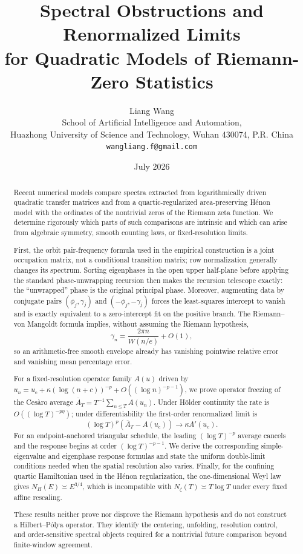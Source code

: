 \documentclass[11pt]{article}
\title{\textbf{Spectral Obstructions and Renormalized Limits}\\
\textbf{for Quadratic Models of Riemann-Zero Statistics}}
\author{Liang Wang\\
\small School of Artificial Intelligence and Automation,\\[-0.2em]
\small Huazhong University of Science and Technology, Wuhan 430074, P.R. China\\
\small \texttt{wangliang.f@gmail.com}}
\date{July 2026}
\theoremstyle{definition}
\theoremstyle{remark}
\newcommand{\uc}{u_{\mathrm c}}
\begin{document}
\maketitle

\begin{abstract}
Recent numerical models compare spectra extracted from logarithmically driven quadratic transfer matrices and from a quartic-regularized area-preserving H\'{e}non model with the ordinates of the nontrivial zeros of the Riemann zeta function.  We determine rigorously which parts of such comparisons are intrinsic and which can arise from algebraic symmetry, smooth counting laws, or fixed-resolution limits.

First, the orbit pair-frequency formula used in the empirical construction is a joint occupation matrix, not a conditional transition matrix; row normalization generally changes its spectrum.  Sorting eigenphases in the open upper half-plane before applying the standard phase-unwrapping recursion then makes the recursion telescope exactly: the ``unwrapped'' phase is the original principal phase.  Moreover, augmenting data by conjugate pairs $(\phi_j,\gamma_j)$ and $(-\phi_j,-\gamma_j)$ forces the least-squares intercept to vanish and is exactly equivalent to a zero-intercept fit on the positive branch.  The Riemann--von Mangoldt formula implies, without assuming the Riemann hypothesis,
\[
    \gamma_n=\frac{2\pi n}{W(n/e)}+O(1),
\]
so an arithmetic-free smooth envelope already has vanishing pointwise relative error and vanishing mean percentage error.

For a fixed-resolution operator family $A(u)$ driven by
$u_n=\uc+\kappa(\log(n+c))^{-p}+O((\log n)^{-p-1})$, we prove operator freezing of the Ces\`aro average $\overline A_T=T^{-1}\sum_{n\le T}A(u_n)$.  Under H\"older continuity the rate is $O((\log T)^{-p\eta})$; under differentiability the first-order renormalized limit is
\[
    (\log T)^p(\overline A_T-A(\uc))\longrightarrow \kappa A'(\uc).
\]
For an endpoint-anchored triangular schedule, the leading $(\log T)^{-p}$ average cancels and the response begins at order $(\log T)^{-p-1}$.
We derive the corresponding simple-eigenvalue and eigenphase response formulas and state the uniform double-limit conditions needed when the spatial resolution also varies.  Finally, for the confining quartic Hamiltonian used in the H\'{e}non regularization, the one-dimensional Weyl law gives $N_H(E)\asymp E^{3/4}$, which is incompatible with $N_\zeta(T)\asymp T\log T$ under every fixed affine rescaling.

These results neither prove nor disprove the Riemann hypothesis and do not construct a Hilbert--P\'{o}lya operator.  They identify the centering, unfolding, resolution control, and order-sensitive spectral objects required for a nontrivial future comparison beyond finite-window agreement.
\end{abstract}
\end{document}
